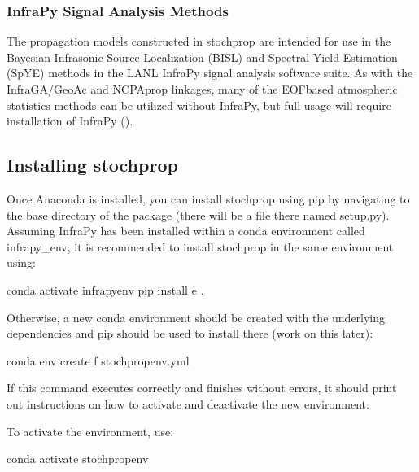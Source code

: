 \documentclass[letterpaper,10pt,english]{sphinxmanual}
\begin{document}
\subsubsection{InfraPy Signal Analysis Methods}
\label{\detokenize{installation:infrapy-signal-analysis-methods}}
The propagation models constructed in stochprop are intended for use in the Bayesian Infrasonic Source Localization (BISL) and Spectral Yield Estimation (SpYE)
methods in the LANL InfraPy signal analysis software suite.  As with the InfraGA/GeoAc and NCPAprop linkages, many of the EOF\sphinxhyphen{}based atmospheric statistics methods
can be utilized without InfraPy, but full usage will require installation of InfraPy ().


\subsection{Installing stochprop}
\label{\detokenize{installation:installing-stochprop}}
Once Anaconda is installed, you can install stochprop using pip by navigating to the base directory of the package (there will be a file there
named setup.py).  Assuming InfraPy has been installed within a conda environment called infrapy\_env, it is recommended to install stochprop in the same environment using:

\begin{sphinxVerbatim}[commandchars=\\\{\}]
\PYGZgt{}\PYGZgt{} conda activate infrapy\PYGZus{}env
\PYGZgt{}\PYGZgt{} pip install \PYGZhy{}e .
\end{sphinxVerbatim}

Otherwise, a new conda environment should be created with the underlying dependencies and pip should be used to install there (work on this later):

\begin{sphinxVerbatim}[commandchars=\\\{\}]
\PYGZgt{}\PYGZgt{} conda env create \PYGZhy{}f stochprop\PYGZus{}env.yml
\end{sphinxVerbatim}

If this command executes correctly and finishes without errors, it should print out instructions on how to activate and deactivate the new environment:

To activate the environment, use:

\begin{sphinxVerbatim}[commandchars=\\\{\}]
\PYGZgt{}\PYGZgt{} conda activate stochprop\PYGZus{}env
\end{sphinxVerbatim}
\end{document}
